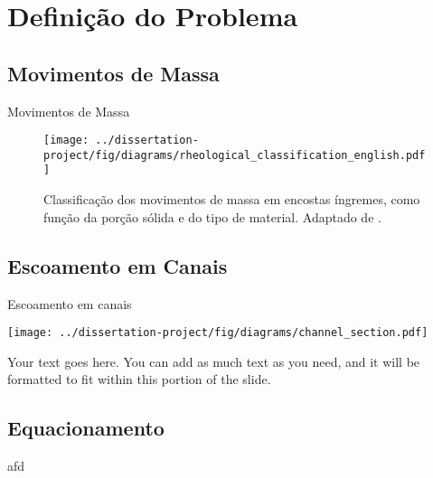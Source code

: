 \section{Definição do Problema}

\subsection{Movimentos de Massa}

\begin{frame}{Movimentos de Massa}
    \begin{figure}
        \centering
        \texttt{[image: ../dissertation-project/fig/diagrams/rheological\_classification\_english.pdf]}
        \caption{Classificação dos movimentos de massa em encostas íngremes, como função
        da porção sólida e do tipo de material. Adaptado de \cite{coussot_recognition_1996}.}
    \end{figure}
\end{frame}


\subsection{Escoamento em Canais}

\begin{frame}{Escoamento em canais}
    
    \begin{minipage}[c]{0.60\textwidth}
        \centering
        \texttt{[image: ../dissertation-project/fig/diagrams/channel\_section.pdf]}
    \end{minipage}
    \hfill
    \begin{minipage}[c]{0.36\textwidth}
        Your text goes here. You can add as much text as you need, and it will be formatted to fit within this portion of the slide.
    \end{minipage}
    
    \end{frame}

\subsection{Equacionamento}

\begin{frame}
    afd
\end{frame}